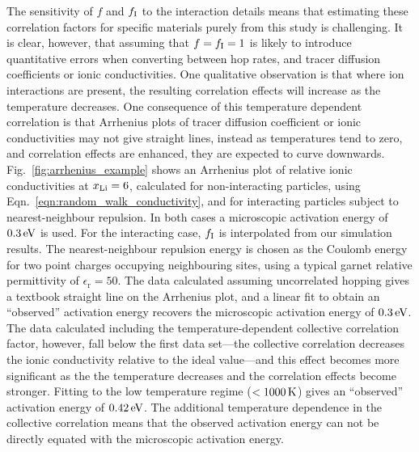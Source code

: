 \documentclass[aps,prb,twocolumn,superscriptaddress,reprint]{revtex4-1}
\newcommand{\xLi}{x_\m{Li}}
\begin{document}
The sensitivity of $f$ and $f_{\mathrm{I}}$ to the interaction details means that estimating these correlation factors for specific materials purely from this study is challenging. It is clear, however, that assuming that $f=f_{\mathrm{I}}=1$ is likely to introduce quantitative errors when converting between hop rates, and tracer diffusion coefficients or ionic conductivities. One qualitative observation is that where ion interactions are present, the resulting correlation effects will increase as the temperature decreases. One consequence of this temperature dependent correlation is that Arrhenius plots of tracer diffusion coefficient or ionic conductivities may not give straight lines, instead as temperatures tend to zero, and correlation effects are enhanced, they are expected to curve downwards. Fig.~\ref{fig:arrhenius_example} shows an Arrhenius plot of relative ionic conductivities at $\xLi=6$, calculated for non-interacting particles, using Eqn.~\ref{eqn:random_walk_conductivity}, and for interacting particles subject to nearest-neighbour repulsion. In both cases a microscopic activation energy of $0.3\,\mathrm{eV}$ is used. For the interacting case, $f_{\mathrm{I}}$ is interpolated from our simulation results. The nearest-neighbour repulsion energy is chosen as the Coulomb energy for two point charges occupying neighbouring sites, using a typical garnet relative permittivity of $\epsilon_\mathrm{r}=50$.\cite{RettenwanderEtAl_InorgChem2015} The data calculated assuming uncorrelated hopping gives a textbook straight line on the Arrhenius plot, and a linear fit to obtain an ``observed'' activation energy recovers the microscopic activation energy of $0.3\,\mathrm{eV}$. The data calculated including the temperature-dependent collective correlation factor, however, fall below the first data set---the collective correlation decreases the ionic conductivity relative to the ideal value---and this effect becomes more significant as the  the temperature decreases and the correlation effects become stronger. Fitting to the low temperature regime ($<1000\,\mathrm{K}$) gives an ``observed'' activation energy of $0.42\,\mathrm{eV}$. The additional temperature dependence in the collective correlation means that the observed activation energy can not be directly equated with the microscopic activation energy.
\end{document}
